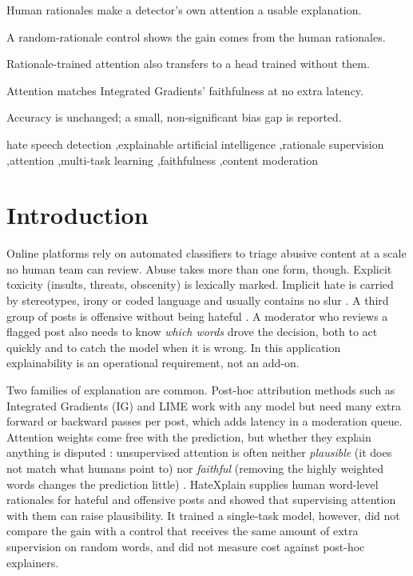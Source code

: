 \documentclass[preprint,12pt,authoryear]{elsarticle}
\begin{document}
\begin{frontmatter}
\begin{highlights}
\item Human rationales make a detector's own attention a usable explanation.
\item A random-rationale control shows the gain comes from the human rationales.
\item Rationale-trained attention also transfers to a head trained without them.
\item Attention matches Integrated Gradients' faithfulness at no extra latency.
\item Accuracy is unchanged; a small, non-significant bias gap is reported.
\end{highlights}

\begin{keyword}
hate speech detection \sep explainable artificial intelligence \sep rationale supervision \sep attention \sep multi-task learning \sep faithfulness \sep content moderation
\end{keyword}

\end{frontmatter}

\section{Introduction}
\label{sec:intro}

Online platforms rely on automated classifiers to triage abusive content at a scale no human team can review. Abuse takes more than one form, though. Explicit toxicity (insults, threats, obscenity) is lexically marked. Implicit hate is carried by stereotypes, irony or coded language and usually contains no slur \citep{elsherief2021latent}. A third group of posts is offensive without being hateful \citep{mathew2021hatexplain,zampieri2019olid}. A moderator who reviews a flagged post also needs to know \emph{which words} drove the decision, both to act quickly and to catch the model when it is wrong. In this application explainability is an operational requirement, not an add-on.

Two families of explanation are common. Post-hoc attribution methods such as Integrated Gradients (IG) \citep{sundararajan2017axiomatic} and LIME \citep{ribeiro2016lime} work with any model but need many extra forward or backward passes per post, which adds latency in a moderation queue. Attention weights come free with the prediction, but whether they explain anything is disputed \citep{jain2019attention,wiegreffe2019attention}: unsupervised attention is often neither \emph{plausible} (it does not match what humans point to) nor \emph{faithful} (removing the highly weighted words changes the prediction little) \citep{jacovi2020faithfully,deyoung2020eraser}. HateXplain \citep{mathew2021hatexplain} supplies human word-level rationales for hateful and offensive posts and showed that supervising attention with them can raise plausibility. It trained a single-task model, however, did not compare the gain with a control that receives the same amount of extra supervision on random words, and did not measure cost against post-hoc explainers.
\end{document}

